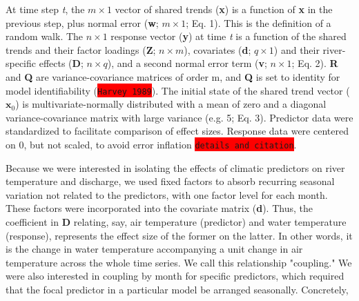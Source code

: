 \documentclass{article}
\begin{document}
At time step {\it t}, the $m \times 1$ vector of shared trends (\textbf{x}) is a function of \textbf{x} in the previous step, plus normal error (\textbf{w}; $m\times 1$; Eq. 1). This is the definition of a random walk. The $n\times 1$ response vector (\textbf{y}) at time {\it t} is a function of the shared trends and their factor loadings (\textbf{Z}; $n\times m$), covariates (\textbf{d}; $q\times 1$) and their river-specific effects (\textbf{D}; $n\times q$), and a second normal error term (\textbf{v}; $n\times 1$; Eq. 2). \textbf{R} and \textbf{Q} are variance-covariance matrices of order m, and \textbf{Q} is set to identity for model identifiability (\colorbox{red}{\lstinline{Harvey 1989}}). The initial state of the shared trend vector ($\bm{x}_0$) is multivariate-normally distributed with a mean of zero and a diagonal variance-covariance matrix with large variance (e.g. 5; Eq. 3). Predictor data were standardized to facilitate comparison of effect sizes. Response data were centered on 0, but not scaled, to avoid error inflation \colorbox{red}{\lstinline{details and citation}}.

Because we were interested in isolating the effects of climatic predictors on river temperature and discharge, we used fixed factors to absorb recurring seasonal variation not related to the predictors, with one factor level for each month. These factors were incorporated into the covariate matrix (\textbf{d}). Thus, the coefficient in \textbf{D} relating, say, air temperature (predictor) and water temperature (response), represents the effect size of the former on the latter. In other words, it is the change in water temperature accompanying a unit change in air temperature across the whole time series. We call this relationship "coupling." We were also interested in coupling by month for specific predictors, which required that the focal predictor in a particular model be arranged seasonally. Concretely,
\end{document}
